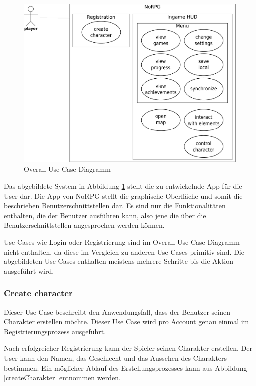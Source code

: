 		\begin{figure}[htbp]
			\centering 
			\label{oucd}
			\includegraphics[width=12cm]{pics/OUCD.pdf}
			\caption{Overall Use Case Diagramm}
		\end{figure}
		
		Das abgebildete System in Abbildung \ref{oucd} stellt die zu entwickelnde App für die User dar. Die App von NoRPG stellt die graphische Oberfläche und somit die beschrieben Benutzerschnittstellen dar. Es sind nur die Funktionalitäten enthalten, die der Benutzer ausführen kann, also jene die über die Benutzerschnittstellen angesprochen werden können. 
		
		Use Cases wie Login oder Registrierung sind im Overall Use Case Diagramm nicht enthalten, da diese im Vergleich zu anderen Use Cases primitiv sind. Die abgebildeten Use Cases enthalten meistens mehrere Schritte bis die Aktion ausgeführt wird.
	
		\subsubsection{Create character}
			Dieser Use Case beschreibt den Anwendungsfall, dass der Benutzer seinen Charakter erstellen möchte. Dieser Use Case wird pro Account genau einmal im Registrierungsprozess ausgeführt.
			
			Nach erfolgreicher Registrierung kann der Spieler seinen Charakter erstellen. Der User kann den Namen, das Geschlecht und das Aussehen des Charakters bestimmen. Ein möglicher Ablauf des Erstellungsprozesses kann aus Abbildung \ref{createCharakter} entnommen werden.
			
